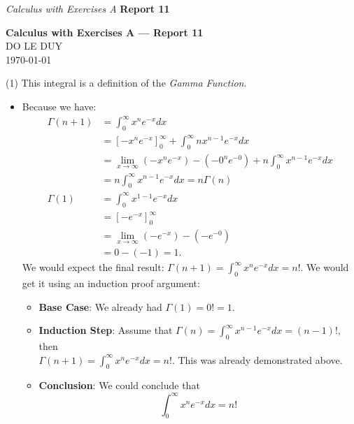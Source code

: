 

\newcommand{\myclass}{Calculus with Exercises A}
\newcommand{\myname}{DO LE DUY}
\newcommand{\myhwtype}{Report 11}
\newcommand{\questiontype}{Problem}
\newcommand{\writtensection}{10}
\newtheorem*{prop}{Proposition}
\usepackage{pgf,tikz,pgfplots}
\pgfplotsset{compat=1.15}
\usepackage{mathrsfs}
\usetikzlibrary{arrows}
\headrule
\header{{\myname}}%
{\emph{\myclass}}%
{\textbf{\myhwtype }}


\thispagestyle{empty}
\begin{center}
  {\Large \textbf{\myclass{} — \myhwtype{} }} \\
  {\myname{} } \\
  \today
\end{center}

\begin{numedquestion}
    (1) This integral is a definition of the \emph{Gamma Function}. 
    \begin{itemize}
        \item Because we have:
        \begin{align*}
            \Gamma(n+1) &=\int_{0}^{\infty} x^{n} e^{-x} d x \\
            &=\left[-x^{n} e^{-x}\right]_{0}^{\infty}+\int_{0}^{\infty} n x^{n-1} e^{-x} d x \\
            &=\lim _{x \rightarrow \infty}\left(-x^{n} e^{-x}\right)-\left(-0^{n} e^{-0}\right)+n \int_{0}^{\infty} x^{n-1} e^{-x} d x \\
            &=n \int_{0}^{\infty} x^{n-1} e^{-x} d x =n \Gamma(n) \\
            \Gamma(1) &=\int_{0}^{\infty} x^{1-1} e^{-x} d x \\
            &=\left[-e^{-x}\right]_{0}^{\infty} \\
            &=\lim _{x \rightarrow \infty}\left(-e^{-x}\right)-\left(-e^{-0}\right) \\
            &=0-(-1) =1.
        \end{align*}
        We would expect the final result: $\Gamma(n+1) = \int_{0}^{\infty} x^{n} e^{-x} d x = n!$. We would get it using an induction proof argument: 
        \begin{itemize}
            \item \textbf{Base Case}: We already had $\Gamma(1) = 0! = 1$. 
            \item \textbf{Induction Step}: Assume that $\Gamma(n) = \int^{\infty}_0 x^{n-1} e^{-x} d x = (n-1)!$, then \\
            $\Gamma(n+1) = \int^{\infty}_0 x^{n} e^{-x} d x = n!$. This was already demonstrated above.
            \item \textbf{Conclusion}: We could conclude that \[\int_{0}^{\infty} x^{n} e^{-x} d x = n!\] 
        \end{itemize}
    \end{itemize}
    

\end{numedquestion}

